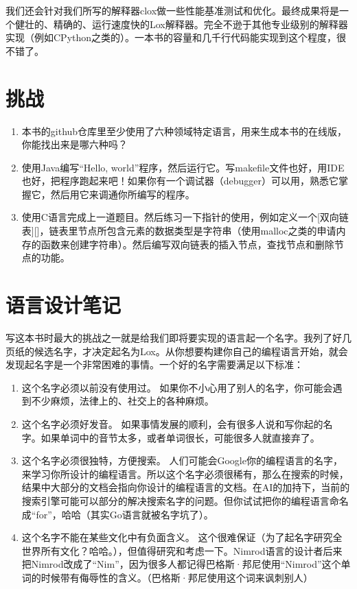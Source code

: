 \documentclass[cn,10pt,math=newtx,citestyle=gb7714-2015,bibstyle=gb7714-2015]{elegantbook}
\begin{document}
我们还会针对我们所写的解释器clox做一些性能基准测试和优化。最终成果将是一个健壮的、精确的、运行速度快的Lox解释器。完全不逊于其他专业级别的解释器实现（例如CPython之类的）。一本书的容量和几千行代码能实现到这个程度，很不错了。

\section{挑战}

\begin{enumerate}
   \item 本书的github仓库里至少使用了六种领域特定语言，用来生成本书的在线版，你能找出来是哪六种吗？
   \item 使用Java编写“Hello, world”程序，然后运行它。写makefile文件也好，用IDE也好，把程序跑起来吧！如果你有一个调试器（debugger）可以用，熟悉它掌握它，然后用它来调通你所编写的程序。
   \item 使用C语言完成上一道题目。然后练习一下指针的使用，例如定义一个[双向链表][]，链表里节点所包含元素的数据类型是字符串（使用malloc之类的申请内存的函数来创建字符串）。然后编写双向链表的插入节点，查找节点和删除节点的功能。
\end{enumerate}

\section{语言设计笔记}

写这本书时最大的挑战之一就是给我们即将要实现的语言起一个名字。我列了好几页纸的候选名字，才决定起名为Lox。从你想要构建你自己的编程语言开始，就会发现起名字是一个非常困难的事情。一个好的名字需要满足以下标准：

\begin{enumerate}
   \item 这个名字必须以前没有使用过。 如果你不小心用了别人的名字，你可能会遇到不少麻烦，法律上的、社交上的各种麻烦。
   \item 这个名字必须好发音。 如果事情发展的顺利，会有很多人说和写你起的名字。如果单词中的音节太多，或者单词很长，可能很多人就直接弃了。
   \item 这个名字必须很独特，方便搜索。 人们可能会Google你的编程语言的名字，来学习你所设计的编程语言。所以这个名字必须很稀有，那么在搜索的时候，结果中大部分的文档会指向你设计的编程语言的文档。在AI的加持下，当前的搜索引擎可能可以部分的解决搜索名字的问题。但你试试把你的编程语言命名成“for”，哈哈（其实Go语言就被名字坑了）。
   \item 这个名字不能在某些文化中有负面含义。 这个很难保证（为了起名字研究全世界所有文化？哈哈。），但值得研究和考虑一下。Nimrod语言的设计者后来把Nimrod改成了“Nim”，因为很多人都记得巴格斯·邦尼使用“Nimrod”这个单词的时候带有侮辱性的含义。（巴格斯·邦尼使用这个词来讽刺别人）
\end{enumerate}
\end{document}
